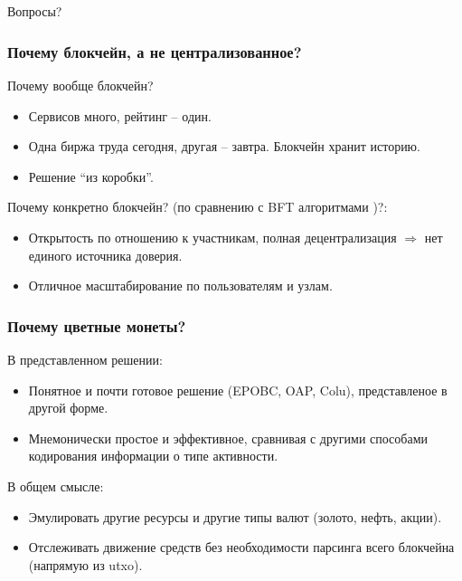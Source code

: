 \documentclass[11pt,handout,pdf,hyperref={unicode}]{beamer}
\newcommand{\backupbegin}{
   \newcounter{finalframe}
   \setcounter{finalframe}{\value{framenumber}}
}
\newcommand{\backupend}{
   \setcounter{framenumber}{\value{finalframe}}
}
\begin{document}
\backupbegin
\section{}

\begin{frame}

  \begin{center}
    \Huge Вопросы?
  \end{center}

\end{frame}


\begin{frame}
  \frametitle{Почему блокчейн, а не централизованное?}

  Почему вообще блокчейн?
  \begin{itemize}
  \item Сервисов много, рейтинг -- один.
  \item Одна биржа труда сегодня, другая -- завтра. Блокчейн хранит историю.
  \item Решение ``из коробки''.
  \end{itemize}

  Почему конкретно блокчейн? (по сравнению с BFT алгоритмами
  \parencite{powbftquest})?:
  \begin{itemize}
  \item Открытость по отношению к участникам, полная децентрализация
    $\Rightarrow$ нет единого источника доверия.
  \item Отличное масштабирование по пользователям и узлам.
  \end{itemize}
\end{frame}

\begin{frame}
  \frametitle{Почему цветные монеты? }

  В представленном решении:
  \begin{itemize}
  \item Понятное и почти готовое решение (EPOBC, OAP, Colu),
    представленое в другой форме.
  \item Мнемонически простое и эффективное, сравнивая с другими
    способами кодирования информации о типе активности.
  \end{itemize}

  В общем смысле:
  \begin{itemize}
  \item Эмулировать другие ресурсы и другие типы валют (золото, нефть,
    акции).
  \item Отслеживать движение средств без необходимости парсинга всего
    блокчейна (напрямую из utxo).
  \end{itemize}
\end{frame}

\backupend
\end{document}
